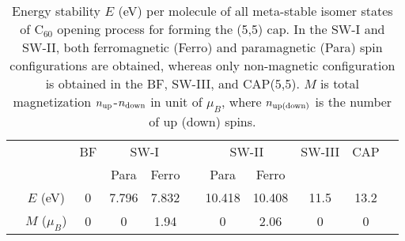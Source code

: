\documentclass[doctor,english,final]{kaist-ucs}
\begin{document}
\begin{table}[t]
\caption{Energy stability $E$ (eV) per molecule of all meta-stable
isomer states of C$_{60}$ opening process for forming the (5,5) cap.
In the SW-I and SW-II, both ferromagnetic (Ferro) and paramagnetic (Para)
spin configurations are obtained, whereas only non-magnetic configuration
is obtained in the BF, SW-III, and CAP(5,5).
$M$ is total magnetization $n_{\rm up}$-$n_{\rm down}$ in unit of $\mu_B$, where
$n_{\rm up(down)}$ is the number of up (down) spins.
}
\label{mag-tab1}
\begin{center}
\begin{tabular} {ccccccccccc}
\hline\hline
& & BF &\multicolumn{2}{c}{SW-I}&&\multicolumn{2}{c}{SW-II}&SW-III&CAP&\\
\cline{4-5} \cline{7-8}
&               &   &  Para & Ferro &&   Para &  Ferro &      &      &\\
\hline
& $E$ (eV)      & 0 & 7.796 & 7.832 && 10.418 & 10.408 & 11.5 & 13.2 &\\
& $M$ ($\mu_B$) & 0 &     0 &  1.94 &&      0 &   2.06 &    0 &    0 &\\
\hline\hline
\end{tabular}
\end{center}
\end{table}






%
%
%
%
%
%
%
\end{document}
